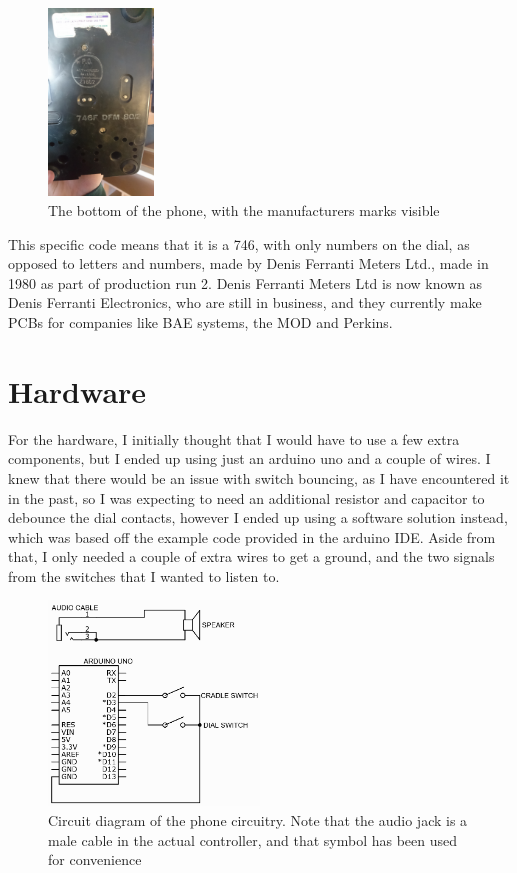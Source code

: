 \documentclass[12pt]{article}
\begin{document}
\begin{figure}[h]
    \centering
    \includegraphics[width=0.25\textwidth]{PhoneBottom}
    \caption{The bottom of the phone, with the manufacturers marks visible}
\end{figure}

This specific code means that it is a 746, with only numbers on the dial, 
as opposed to letters and numbers, made by Denis Ferranti Meters Ltd., 
made in 1980 as part of production run 2. 
Denis Ferranti Meters Ltd is now known as Denis Ferranti Electronics, who are still in business, 
and they currently make PCBs for companies like BAE systems, the MOD and Perkins.\\

\FloatBarrier
\section{Hardware} %
For the hardware, I initially thought that I would have to use a few extra components, 
but I ended up using just an arduino uno and a couple of wires. 
I knew that there would be an issue with switch bouncing, as I have encountered it in the past, 
so I was expecting to need an additional resistor and capacitor to debounce the dial contacts, 
however I ended up using a software solution instead, 
which was based off the example code provided in the arduino IDE. Aside from that, 
I only needed a couple of extra wires to get a ground, 
and the two signals from the switches that I wanted to listen to.

\begin{figure}[h]
    \centering
    \includegraphics[width=0.5\textwidth]{CircuitDiagram}
    \caption{Circuit diagram of the phone circuitry. Note that the audio jack is a male cable in the actual controller, and that symbol has been used for convenience}
\end{figure}
\end{document}
